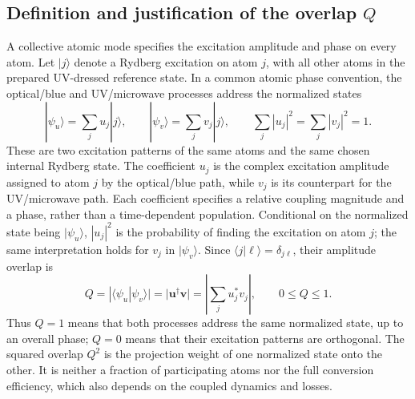 \documentclass[aps,pra,onecolumn,10pt,letterpaper,notitlepage,nofootinbib,amsmath,amssymb]{revtex4-2}
\begin{document}
\subsection{Definition and justification of the overlap \texorpdfstring{$Q$}{Q}}
\label{sec:q-definition}
A collective atomic mode specifies the excitation amplitude and phase on every
atom. Let $|j\rangle$ denote a Rydberg excitation on atom $j$, with all other atoms
in the prepared UV-dressed reference state. In a common atomic phase convention,
the optical/blue and UV/microwave processes address the normalized states
\begin{equation}
 |\psi_u\rangle=\sum_j u_j|j\rangle,\qquad
 |\psi_v\rangle=\sum_j v_j|j\rangle,\qquad
 \sum_j|u_j|^2=\sum_j|v_j|^2=1.
 \label{eq:profile-states}
\end{equation}
These are two excitation patterns of the same atoms and the same chosen
internal Rydberg state. The coefficient $u_j$ is the complex excitation
amplitude assigned to atom $j$ by the optical/blue path, while $v_j$ is its
counterpart for the UV/microwave path. Each coefficient specifies a relative
coupling magnitude and a phase, rather than a time-dependent population.
Conditional on the normalized state being $|\psi_u\rangle$, $|u_j|^2$ is the
probability of finding the excitation on atom $j$; the same interpretation
holds for $v_j$ in $|\psi_v\rangle$. Since $\langle j|\ell\rangle=\delta_{j\ell}$,
their amplitude overlap is
\begin{equation}
 Q=|\langle\psi_u|\psi_v\rangle|
  =|\mathbf u^\dagger\mathbf v|
  =\left|\sum_j u_j^*v_j\right|,\qquad 0\leq Q\leq1.
 \label{eq:overlap}
\end{equation}
Thus $Q=1$ means that both processes address the same normalized state, up to an
overall phase; $Q=0$ means that their excitation patterns are orthogonal.
The squared overlap $Q^2$ is the projection weight of one normalized state onto
the other. It is neither a fraction of participating atoms nor the full
conversion efficiency, which also depends on the coupled dynamics and losses.
\end{document}
